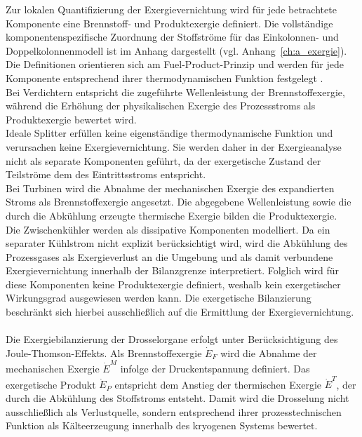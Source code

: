 Zur lokalen Quantifizierung der Exergievernichtung wird für jede betrachtete
Komponente eine Brennstoff- und Produktexergie definiert. 
Die vollständige komponentenspezifische Zuordnung der Stoffströme für das
Einkolonnen- und Doppelkolonnenmodell ist im Anhang dargestellt
(vgl. Anhang~\ref{ch:a_exergie}). Die Definitionen orientieren sich am
Fuel-Product-Prinzip und werden für jede Komponente entsprechend ihrer
thermodynamischen Funktion festgelegt
\cite{lazzaretto_speco_2006, tsatsaronis_definitions_2007}.\\
Bei Verdichtern entspricht die zugeführte
Wellenleistung der Brennstoffexergie, während die Erhöhung der physikalischen Exergie des Prozessstroms als Produktexergie bewertet wird. \\
Ideale Splitter erfüllen keine eigenständige thermodynamische Funktion und verursachen keine Exergievernichtung. Sie werden daher in der Exergieanalyse nicht als separate Komponenten geführt, da der exergetische Zustand der Teilströme dem des Eintrittsstroms entspricht.\\
Bei Turbinen wird
die Abnahme der mechanischen Exergie des expandierten Stroms als
Brennstoffexergie angesetzt. Die abgegebene Wellenleistung sowie die durch die
Abkühlung erzeugte thermische Exergie bilden die Produktexergie. \\
Die Zwischenkühler werden als dissipative Komponenten modelliert. Da ein separater Kühlstrom nicht explizit berücksichtigt wird, wird die Abkühlung des Prozessgases als Exergieverlust an die Umgebung und als damit verbundene Exergievernichtung innerhalb der Bilanzgrenze interpretiert. Folglich wird für diese Komponenten keine Produktexergie definiert, weshalb kein exergetischer Wirkungsgrad ausgewiesen werden kann. Die exergetische Bilanzierung beschränkt sich hierbei ausschließlich auf die Ermittlung der Exergievernichtung.\\
\\
Die Exergiebilanzierung der Drosselorgane erfolgt unter Berücksichtigung des
Joule-Thomson-Effekts. Als Brennstoffexergie \(\dot{E}_F\) wird die Abnahme der
mechanischen Exergie \(\dot{E}^M\) infolge der Druckentspannung definiert. Das
exergetische Produkt \(\dot{E}_P\) entspricht dem Anstieg der thermischen
Exergie \(\dot{E}^T\), der durch die Abkühlung des Stoffstroms entsteht. Damit
wird die Drosselung nicht ausschließlich als Verlustquelle, sondern entsprechend
ihrer prozesstechnischen Funktion als Kälteerzeugung innerhalb des kryogenen
Systems bewertet.\\
\\
